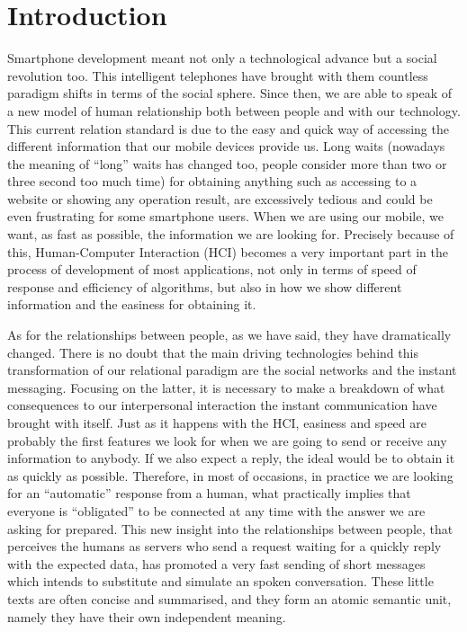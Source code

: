 \chapter{Introduction}
\label{cap:introduccion}


Smartphone development meant not only a technological advance but a social revolution too. This intelligent telephones have brought with them countless paradigm shifts in terms of the social sphere. Since then, we are able to speak of a new model of human relationship both between people and with our technology. This current relation standard is due to the easy and quick way of accessing the different information that our mobile devices provide us. Long waits (nowadays the meaning of ``long'' waits has changed too, people consider more than two or three second too much time) for obtaining anything such as accessing to a website or showing any operation result, are excessively tedious and could be even frustrating for some smartphone users. When we are using our mobile, we want, as fast as possible, the information we are looking for. Precisely because of this, Human-Computer Interaction (HCI) becomes a very important part in the process of development of most applications, not only in terms of speed of response and efficiency of algorithms, but also in how we show different information and the easiness for obtaining it.

As for the relationships between people, as we have said, they have dramatically changed. There is no doubt that the main driving technologies behind this transformation of our relational paradigm are the social networks and the instant messaging. Focusing on the latter, it is necessary to make a breakdown of what consequences to our interpersonal interaction the instant communication have brought with itself. Just as it happens with the HCI, easiness and speed are probably the first features we look for when we are going to send or receive any information to anybody. If we also expect a reply, the ideal would be to obtain it as quickly as possible. Therefore, in most of occasions, in practice we are looking for an ``automatic'' response from a human, what practically implies that everyone is ``obligated'' to be connected at any time with the answer we are asking for prepared. This new insight into the relationships between people, that perceives the humans as servers who send a request waiting for a quickly reply with the expected data, has promoted a very fast sending of short messages which intends to substitute and simulate an spoken conversation. These little texts are often concise and summarised, and they form an atomic semantic unit, namely they have their own independent meaning.


